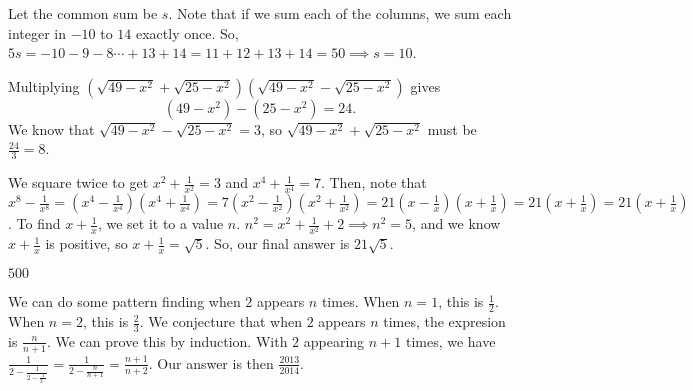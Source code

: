 \documentclass[11pt]{article}
\begin{document}
\begin{sol}
Let the common sum be $s$. Note that if we sum each of the columns, we sum each integer in $-10$ to $14$ exactly once. So, $5s=-10-9-8\cdots +13+14=11+12+13+14=50\implies s=\boxed{10}$.
\end{sol}


\begin{sol}
Multiplying $(\sqrt{49-x^2}+\sqrt{25-x^2})(\sqrt{49-x^2}-\sqrt{25-x^2}) $ gives $$(49-x^2) - (25-x^2) = 24.$$ We know that $\sqrt{49-x^2}-\sqrt{25-x^2}=3$, so $\sqrt{49-x^2}+\sqrt{25-x^2}$ must be $\frac{24}{3} = \boxed{8}$.
\end{sol}


\begin{sol} 
We square twice to get $x^2+\frac{1}{x^2}=3$ and $x^4+\frac{1}{x^4}=7$. Then, note that $x^8-\frac{1}{x^8}=(x^4-\frac{1}{x^4})(x^4+\frac{1}{x^4})=7(x^2-\frac{1}{x^2})(x^2+\frac{1}{x^2})=21(x-\frac{1}{x})(x+\frac{1}{x})=21(x+\frac{1}{x})=21(x+\frac{1}{x})$. To find $x+\frac{1}{x}$, we set it to a value $n$. $n^2 = x^2 + \frac{1}{x^2} + 2 \implies n^2 = 5$, and we know $x+\frac{1}{x}$ is positive, so $x+\frac{1}{x} = \sqrt{5}$. So, our final answer is $\boxed{21\sqrt{5}}$.
\end{sol}


\begin{sol}
$\boxed{500}$
\end{sol}


\begin{sol}
We can do some pattern finding when $2$ appears $n$ times. When $n=1$, this is $\frac{1}{2}$. When $n=2$, this is $\frac{2}{3}$. We conjecture that when $2$ appears $n$ times, the expresion is $\frac{n}{n+1}$. We can prove this by induction. With $2$ appearing $n+1$ times, we have $\frac{1}{2-\frac{1}{2-\frac{1}{2\cdots}}} = \frac{1}{2-\frac{n}{n+1}}=\frac{n+1}{n+2}$. Our answer is then $\boxed{\frac{2013}{2014}}$.
\end{sol}
\end{document}
